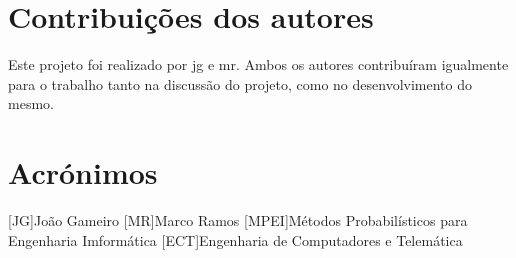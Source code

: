 \documentclass{report}
\begin{document}
\chapter{Contribuições dos autores}
Este projeto foi realizado por \ac{jg} e \ac{mr}.
Ambos os autores contribuíram igualmente para o trabalho tanto na discussão do projeto, como no desenvolvimento do mesmo. 

\chapter*{Acrónimos}
\begin{acronym}
[JG]{João Gameiro}
[MR]{Marco Ramos}
[MPEI]{Métodos Probabilísticos para Engenharia Imformática}
[ECT]{Engenharia de Computadores e Telemática}
\end{acronym}


\printbibliography
\end{document}

